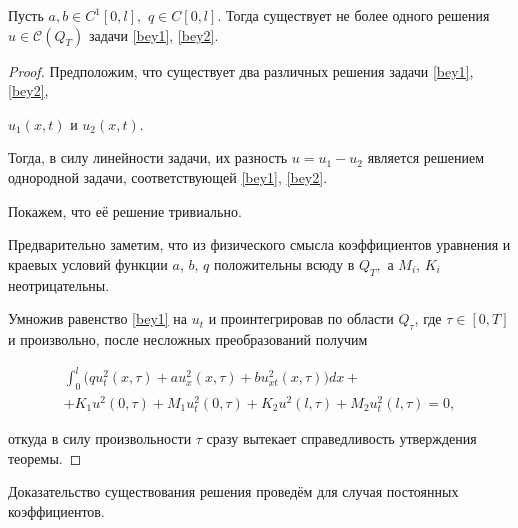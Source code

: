 \begin{theorem}[1]%

Пусть $a, b \in C^1[0, l],$ $q\in C[0, l].$ Тогда существует не более одного решения $u\in\mathcal{C}(Q_T)$ задачи \rm  \eqref{bey1}, \eqref{bey2}.

\end{theorem}



\smallskip



\begin{proof}%

Предположим, что существует два различных решения задачи \eqref{bey1}, \eqref{bey2},

$u_1(x,t)$ и $u_2(x,t)$. 

Тогда, в силу линейности задачи, их разность $u=u_1-u_2$ является решением однородной задачи, соответствующей \eqref{bey1}, \eqref{bey2}.

Покажем, что её решение тривиально. 

Предварительно заметим, что из физического смысла коэффициентов уравнения и краевых условий функции $a$, $b$, $q$ положительны всюду в $Q_T,$ а $M_i$, $K_i$ неотрицательны.



Умножив равенство \eqref{bey1} на $u_t$ и проинтегрировав по области $Q_{\tau}$, где \linebreak \mbox{$\tau \in [0, T]$} и произвольно, после несложных преобразований получим

\begin{multline*}

\int_0^l\bigl(qu_t^2(x,\tau)+au_x^2(x,\tau)+bu^2_{xt}(x,\tau)\bigr) dx+

\\

+K_1u^2(0,\tau)+M_1u^2_t(0,\tau)+K_2u^2(l,\tau)+M_2u^2_t(l,\tau)=0,

\end{multline*}

откуда в силу произвольности $\tau$ сразу вытекает справедливость утверждения теоремы. \end{proof}



\smallskip



Доказательство существования решения проведём для случая постоянных коэффициентов.



